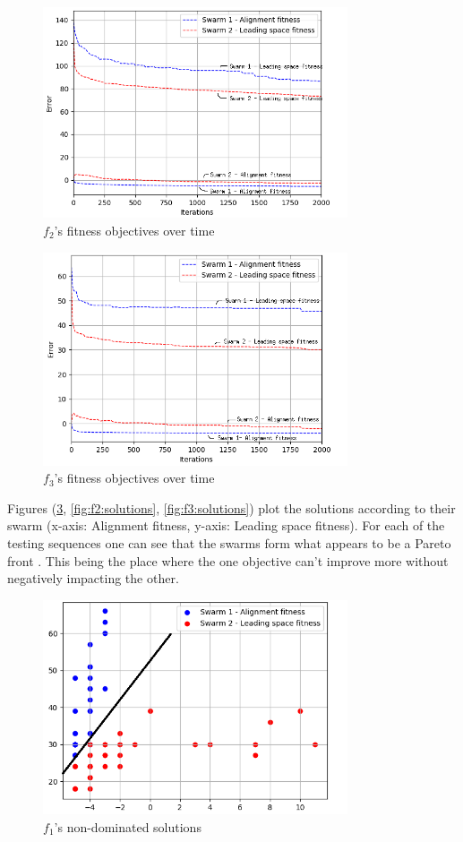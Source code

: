 \documentclass[conference]{IEEEtran}
\begin{document}
\begin{figure}[htbp]
\centerline{\includegraphics[width=90mm]{images/results/f2-fitness.png}}
\caption{$f_2$'s fitness objectives over time }
\label{fig:f2:fitness}
\end{figure}

\begin{figure}[htbp]
\centerline{\includegraphics[width=90mm]{images/results/f3-fitness.png}}
\caption{$f_3$'s fitness objectives over time }
\label{fig:f3:fitness}
\end{figure}


\newpage
Figures (\ref{fig:f1:solutions}, \ref{fig:f2:solutions}, \ref{fig:f3:solutions}) plot the solutions according to their swarm (x-axis: Alignment fitness, y-axis: Leading space fitness). For each of the testing sequences one can see that the swarms form what appears to be a Pareto front \cite{kian-lim:pso}. This being the place where the one objective can't improve more without negatively impacting the other. 

\begin{figure}[htbp]
\centerline{\includegraphics[width=90mm]{images/results/f1-solutions.png}}
\caption{$f_1$'s non-dominated solutions }
\label{fig:f1:solutions}
\end{figure}
\end{document}
